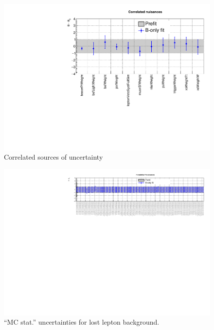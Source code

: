 \begin{figure}[h!]
  \centering
  \caption{Correlated sources of uncertainty}
  \includegraphics[width=1.\linewidth]{figures/results/36invfb/postfit/nuis/Correlated_nuisances}
\end{figure}

\clearpage
\begin{figure}[h!]
  \centering
  \caption{``MC stat.'' uncertainties for lost lepton background.}
  \includegraphics[width=1.\linewidth]{figures/results/36invfb/postfit/nuis/FormulaSystTtw_nuisances}
\end{figure}

